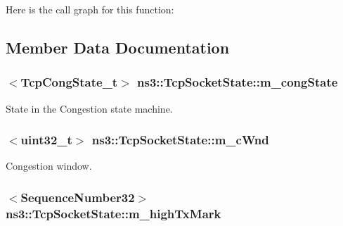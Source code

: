 Here is the call graph for this function\+:




\subsection{Member Data Documentation}
\subsubsection[{\texorpdfstring{m\+\_\+cong\+State}{m_congState}}]{$<${\bf Tcp\+Cong\+State\+\_\+t}$>$ ns3\+::\+Tcp\+Socket\+State\+::m\+\_\+cong\+State}\hypertarget{classns3_1_1TcpSocketState_a4053e1eb120c572d0881b04620b52c30}{}\label{classns3_1_1TcpSocketState_a4053e1eb120c572d0881b04620b52c30}


State in the Congestion state machine. 

\subsubsection[{\texorpdfstring{m\+\_\+c\+Wnd}{m_cWnd}}]{$<$uint32\+\_\+t$>$ ns3\+::\+Tcp\+Socket\+State\+::m\+\_\+c\+Wnd}\hypertarget{classns3_1_1TcpSocketState_a7cd3d2156a483c1db436097477a0fd7f}{}\label{classns3_1_1TcpSocketState_a7cd3d2156a483c1db436097477a0fd7f}


Congestion window. 

\subsubsection[{\texorpdfstring{m\+\_\+high\+Tx\+Mark}{m_highTxMark}}]{$<${\bf Sequence\+Number32}$>$ ns3\+::\+Tcp\+Socket\+State\+::m\+\_\+high\+Tx\+Mark}\hypertarget{classns3_1_1TcpSocketState_a2c46f51fd8e2bf43b564ea838b43b8bb}{}\label{classns3_1_1TcpSocketState_a2c46f51fd8e2bf43b564ea838b43b8bb}


